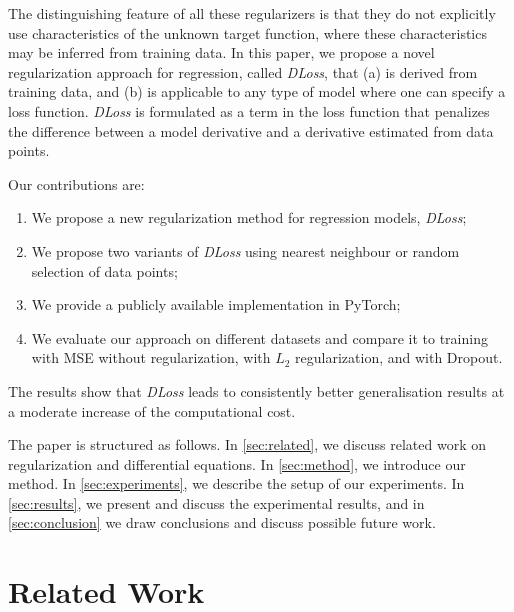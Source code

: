 \documentclass{article}
\newcommand{\kibitz}[2]{\ifnum\Comments=1\textcolor{#1}{#2}\fi}
\newcommand{\kizito}[1]{\kibitz{red} {[Kizito: #1]}}
\newcommand{\enrico}[1]{\kibitz{blue} {[Enrico: #1]}}
\begin{document}
The distinguishing feature of all these regularizers is that they do not explicitly use characteristics of the unknown target function, where these characteristics may be inferred from training data. %
In this paper, we propose a novel regularization approach for regression, called \emph{DLoss}, that (a) is derived from training data, and (b) is applicable to any type of model where one can specify a loss function.
\emph{DLoss} is formulated as a term in the loss function that penalizes the difference between a model derivative and a derivative estimated from data points. 

Our contributions are:
\begin{enumerate}
 \item We propose a new regularization method for regression models, \emph{DLoss};
 \item We propose two variants of \emph{DLoss} using nearest neighbour or random selection of data points;
 \item We provide a publicly available implementation in PyTorch;
 \item We evaluate our approach on different datasets and compare it to training with MSE without regularization, with $L_2$ regularization, and with Dropout.
\end{enumerate}
The results show that \emph{DLoss} leads to consistently better generalisation results at a moderate increase of the computational cost.

The paper is structured as follows.
In \autoref{sec:related}, we discuss related work on regularization and differential equations. 
In \autoref{sec:method}, we introduce our method. 
In \autoref{sec:experiments}, we describe the setup of our experiments. 
In \autoref{sec:results}, we present and discuss the experimental results, and in \autoref{sec:conclusion} we draw conclusions and discuss possible future work.


\section{Related Work}\label{sec:related}
\end{document}
